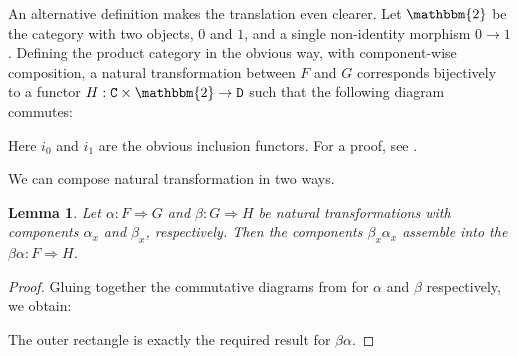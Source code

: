 \documentclass[11 pt]{amsart}
\theoremstyle{plain}   %
\newtheorem{lemma}{Lemma}[section]
\theoremstyle{definition}
\theoremstyle{remark}
\numberwithin{equation}{section}
\def\nat{\Rightarrow}
\newcommand{\punctuation}[1]{\makebox[0pt][l]{#1}}
\newcommand{\cat}[1]{{\normalfont\texttt{#1}}}
\begin{document}
An alternative definition makes the translation even clearer. Let $\mathbbm{2}$
be the category with two objects, $0$ and $1$, and a single non-identity
morphism $0\rightarrow 1$. Defining the product category in the obvious way,
with component-wise composition, a natural transformation between $F$ and $G$
corresponds bijectively to a functor $H:
	\cat{C}\times\mathbbm{2}\rightarrow\cat{D}$ such that the following diagram
commutes:

\begin{figure}[H]
	\centering
\end{figure}

Here $i_0$ and $i_1$ are the obvious inclusion functors. For a proof, see
\cite[Lemma 1.5.1]{Riehl}.

We can compose natural transformation in two ways.

\begin{lemma}\label{vertical composition}
	Let $\alpha: F\nat G$ and $\beta: G\nat H$ be natural transformations with
	components $\alpha_x$ and $\beta_x$, respectively. Then the components
	$\beta_x\alpha_x$ assemble into the $\beta\alpha: F\nat H$.
\end{lemma}

\begin{proof}
	Gluing together the commutative diagrams from 
	for $\alpha$ and $\beta$ respectively, we obtain:
	\begin{figure}[H]
		\centering
	\end{figure}
	The outer rectangle is exactly the required result for $\beta\alpha$.
\end{proof}
\end{document}
